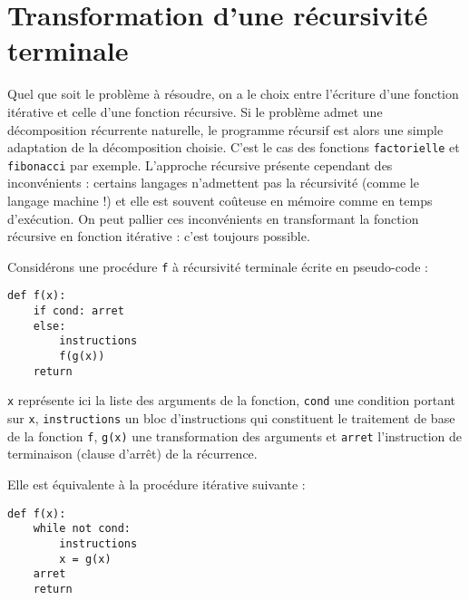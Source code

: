 \section{Transformation d'une récursivité terminale}\label{methode:recursivite}
Quel que soit le problème à résoudre, on a le choix entre l'écriture d'une fonction itérative et celle d'une
fonction récursive. Si le problème admet une décomposition récurrente naturelle, le programme récursif est
alors une simple adaptation de la décomposition choisie. C'est le cas des fonctions {\tt factorielle} et
{\tt fibonacci} par exemple. 
L'approche récursive présente cependant des inconvénients :
certains langages n'admettent pas la récursivité (comme le langage machine !)
et elle est souvent coûteuse en mémoire comme en temps d'exécution. 
On peut pallier ces inconvénients en transformant la fonction récursive 
en fonction itérative : c'est toujours possible.

Considérons une procédure {\tt f} à récursivité terminale écrite en pseudo-code :

\noindent\mbox{}\hspace*{1cm}\begin{py}{4cm}
\begin{verbatim}
def f(x):
    if cond: arret
    else:
        instructions
        f(g(x))
    return
\end{verbatim}
\end{py}
\hfill
\begin{py}{9cm}
{\tt x} représente ici la liste des arguments de la fonction,
{\tt cond} une condition portant sur {\tt x}, 
{\tt instructions} un bloc d'instructions qui constituent
le traitement de base de la fonction {\tt f}, 
{\tt g(x)} une transformation des arguments et {\tt arret}
l'instruction de terminaison (clause d'arrêt) de la récurrence.
\end{py}

\vspace*{2mm}

\noindent Elle est équivalente à la procédure itérative suivante :

\noindent\mbox{}\hspace*{1cm}\begin{py}{4cm}
\begin{verbatim}
def f(x):
    while not cond: 
        instructions
        x = g(x)
    arret
    return
\end{verbatim}
\end{py}

